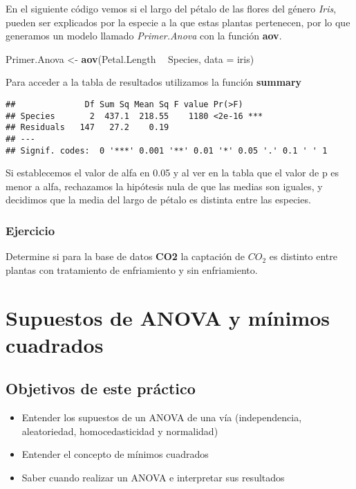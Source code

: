 \documentclass[]{book}
\newenvironment{Shaded}{\begin{snugshade}}{\end{snugshade}}
\newcommand{\DataTypeTok}[1]{\textcolor[rgb]{0.13,0.29,0.53}{#1}}
\newcommand{\KeywordTok}[1]{\textcolor[rgb]{0.13,0.29,0.53}{\textbf{#1}}}
\newcommand{\NormalTok}[1]{#1}
\newcommand{\OperatorTok}[1]{\textcolor[rgb]{0.81,0.36,0.00}{\textbf{#1}}}
\newcommand{\StringTok}[1]{\textcolor[rgb]{0.31,0.60,0.02}{#1}}
\providecommand{\tightlist}{%
  \setlength{\itemsep}{0pt}\setlength{\parskip}{0pt}}
\begin{document}
En el siguiente código vemos si el largo del pétalo de las flores del género \emph{Iris}, pueden ser explicados por la especie a la que estas plantas pertenecen, por lo que generamos un modelo llamado \emph{Primer.Anova} con la función \textbf{aov}.

\begin{Shaded}
\begin{Highlighting}[]
\NormalTok{Primer.Anova <-}\StringTok{ }\KeywordTok{aov}\NormalTok{(Petal.Length }\OperatorTok{~}\StringTok{ }\NormalTok{Species, }\DataTypeTok{data =}\NormalTok{ iris)}
\end{Highlighting}
\end{Shaded}

Para acceder a la tabla de resultados utilizamos la función \textbf{summary}

\begin{verbatim}
##              Df Sum Sq Mean Sq F value Pr(>F)    
## Species       2  437.1  218.55    1180 <2e-16 ***
## Residuals   147   27.2    0.19                   
## ---
## Signif. codes:  0 '***' 0.001 '**' 0.01 '*' 0.05 '.' 0.1 ' ' 1
\end{verbatim}

Si establecemos el valor de alfa en 0.05 y al ver en la tabla que el valor de p es menor a alfa, rechazamos la hipótesis nula de que las medias son iguales, y decidimos que la media del largo de pétalo es distinta entre las especies.

\hypertarget{ejercicio}{%
\subsection{Ejercicio}\label{ejercicio}}

Determine si para la base de datos \textbf{CO2} la captación de \(CO_2\) es distinto entre plantas con tratamiento de enfriamiento y sin enfriamiento.

\hypertarget{Supuestos}{%
\chapter{Supuestos de ANOVA y mínimos cuadrados}\label{Supuestos}}

\hypertarget{objetivos-de-este-practico}{%
\section{Objetivos de este práctico}\label{objetivos-de-este-practico}}

\begin{itemize}
\tightlist
\item
  Entender los supuestos de un ANOVA de una vía (independencia, aleatoriedad, homocedasticidad y normalidad)
\item
  Entender el concepto de mínimos cuadrados
\item
  Saber cuando realizar un ANOVA e interpretar sus resultados
\end{itemize}
\end{document}
